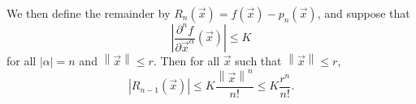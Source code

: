 \documentclass{amsart}
\newcommand{\abs}[1]{\left\lvert#1\right\rvert}
\newcommand{\xvec}{\vec x}
\newcommand{\norm}[1]{\left\lVert#1\right\rVert}
\begin{document}
We then define the remainder by $R_n(\xvec)=f(\xvec)-p_n(\xvec)$, and suppose that
\[\abs{\dfrac{\partial^n f}{\partial\xvec^\alpha}(\xvec)}\le K\]
for all $\abs\alpha=n$ and $\norm\xvec\le r$.  Then for all $\xvec$ such that $\norm\xvec\le r$,
\[\abs{R_{n-1}(\xvec)}\le K\frac{\norm\xvec^n}{n!}\le K\frac{r^n}{n!}.\]

\end{document}
